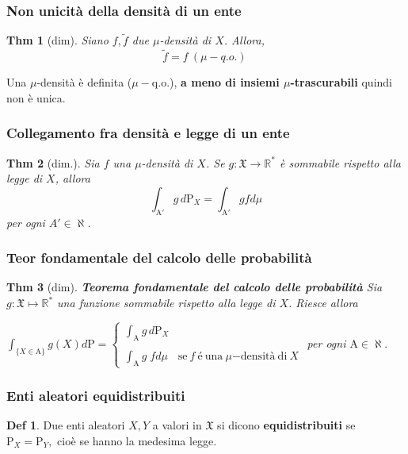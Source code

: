 \documentclass[a4paper,11pt]{article}
\theoremstyle{plain}
\newtheorem{thm}{Thm}[section]
\theoremstyle{definition}
\newtheorem{defn}{Def}[section]
\theoremstyle{remark}
\begin{document}
\subsubsection{Non unicità della densità di un ente}
\begin{thm} [dim] Siano $f,\tilde{f}$ due $\mu$-densità di $X$. Allora,
$$
\tilde{f}=f\ (\mu -q.o.)\ 
$$
\end{thm}

\noindent
Una $\mu$-densità è definita ($\mu-$q.o.), \textbf{a meno di insiemi $\mu$-trascurabili} quindi non è unica.


\subsubsection{Collegamento fra densità e legge di un ente}
\begin{thm} [dim.] Sia $f$ una $\mu$-densità di $X$. Se $g: \mathfrak{X}\rightarrow \mathbb{R}^*$ è sommabile rispetto alla legge di $X$, allora
$$
\int_{\mathrm{A'}}g \,d\mathrm{P}_{X}=\int_{\mathrm{A'}}gfd\mu
$$
per ogni $A'\in \aleph$.
\end{thm}

\subsubsection{Teor fondamentale del calcolo delle probabilità}
\begin{thm} [dim] \textbf{Teorema fondamentale del calcolo delle probabilità} 
Sia $g:\mathfrak{X}\mapsto \mathbb{R}^{*}$ una funzione sommabile rispetto alla legge di $X$. Riesce allora

$\displaystyle \int_{\{X\in \mathrm{A}\}}g(X)d\mathrm{P}=\left\{\begin{array}{ll}
\displaystyle \int_{\mathrm{A}}g \, d\mathrm{P}_{X} & \\
 & \\
\displaystyle \int_{\mathrm{A}}g \; fd\mu & \mathrm{s}\mathrm{e}\ f\ \text{é}\ \mathrm{u}\mathrm{n}\mathrm{a}\ 
\mu \mathrm{-}\mathrm{d}\mathrm{e}\mathrm{n}\mathrm{s}\mathrm{i} \mathrm{tà}\ \mathrm{d}\mathrm{i}\ X
\end{array}\right.$
per ogni $\mathrm{A}\in\aleph.$
\end{thm}




\subsubsection{Enti aleatori equidistribuiti}
\begin{defn}
Due enti aleatori $X, Y$ a valori in $\mathfrak{X}$ si dicono \textbf{equidistribuiti} se $\mathrm{P}_{X}=\mathrm{P}_{Y},$ cioè se hanno la medesima legge.
\end{defn}
\end{document}
